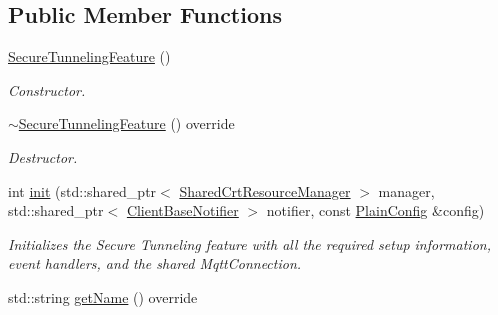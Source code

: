 \subsection*{Public Member Functions}
\begin{DoxyCompactItemize}
\item 
\mbox{\label{class_aws_1_1_iot_1_1_device_client_1_1_secure_tunneling_1_1_secure_tunneling_feature_a91ae57f57ac24b8da585356f47981d94}} 
\hyperlink{class_aws_1_1_iot_1_1_device_client_1_1_secure_tunneling_1_1_secure_tunneling_feature_a91ae57f57ac24b8da585356f47981d94}{Secure\+Tunneling\+Feature} ()
\begin{DoxyCompactList}\small\item\em Constructor. \end{DoxyCompactList}\item 
\mbox{\label{class_aws_1_1_iot_1_1_device_client_1_1_secure_tunneling_1_1_secure_tunneling_feature_a90c1083b18d61d7dc8a7018e54494e09}} 
\hyperlink{class_aws_1_1_iot_1_1_device_client_1_1_secure_tunneling_1_1_secure_tunneling_feature_a90c1083b18d61d7dc8a7018e54494e09}{$\sim$\+Secure\+Tunneling\+Feature} () override
\begin{DoxyCompactList}\small\item\em Destructor. \end{DoxyCompactList}\item 
int \hyperlink{class_aws_1_1_iot_1_1_device_client_1_1_secure_tunneling_1_1_secure_tunneling_feature_ae8600a395ea715e35ccd12a8f79be34c}{init} (std\+::shared\+\_\+ptr$<$ \hyperlink{class_aws_1_1_iot_1_1_device_client_1_1_shared_crt_resource_manager}{Shared\+Crt\+Resource\+Manager} $>$ manager, std\+::shared\+\_\+ptr$<$ \hyperlink{class_aws_1_1_iot_1_1_device_client_1_1_client_base_notifier}{Client\+Base\+Notifier} $>$ notifier, const \hyperlink{struct_aws_1_1_iot_1_1_device_client_1_1_plain_config}{Plain\+Config} \&config)
\begin{DoxyCompactList}\small\item\em Initializes the Secure Tunneling feature with all the required setup information, event handlers, and the shared Mqtt\+Connection. \end{DoxyCompactList}\item 
std\+::string \hyperlink{class_aws_1_1_iot_1_1_device_client_1_1_secure_tunneling_1_1_secure_tunneling_feature_accc93db855be85847c3472754439594f}{get\+Name} () override

\end{DoxyCompactItemize}
